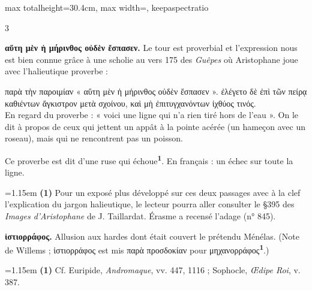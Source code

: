 \documentclass[11pt,twoside]{book}
\newcommand{\italique}[1]{\textit{#1}}
\newcommand{\citComm}[1]{\begin{quoting}[vskip=0.4pt,leftmargin=0.7em,rightmargin=0.2em]#1\end{quoting}}
\newcommand{\francais}[1]{{\policeFr #1}}
\newcommand{\marqueur}[1]{\textsuperscript{\color{rubricRed}\textbf{#1}}}
\begin{document}
\begin{adjustbox}{max totalheight=30.4cm, max width=\textwidth, keepaspectratio}
\begin{minipage}{\textwidth}
{\begin{multicols}{3}
\par\vspace{1.5pt}
 \textbf{αὕτη μὲν ἡ μήρινθος οὐδὲν ἔσπασεν.} Le tour est proverbial et l'expression nous est bien connue grâce à une scholie au vers 175 des \italique{Guêpes} où Aristophane joue avec l'halieutique proverbe :
\citComm{παρὰ τὴν παροιμίαν « αὕτη μὲν ἡ μήρινθος οὐδὲν ἔσπασεν ». ἐλέγετο δὲ ἐπὶ τῶν πείρᾳ καθιέντων ἄγκιστρον μετὰ σχοίνου, καὶ μὴ ἐπιτυγχανόντων ἰχθύος τινός.\\
\francais{En regard du proverbe : « voici une ligne qui n'a rien tiré hors de l'eau ». On le dit à propos de ceux qui jettent un appât à la pointe acérée (un hameçon avec un roseau), mais qui ne rencontrent pas un poisson.}}
\par\vspace{1.5pt}
\noindent Ce proverbe est dit d'une ruse qui échoue\marqueur{1}. En français : un échec sur toute la ligne.
\par\vspace{1.5pt}
\par\vspace{1.2pt}\par\nopagebreak\vspace{1pt}\noindent\hangindent=1.15em {\color{sepiaNote}\textbf{(1)}} Pour un exposé plus développé sur ces deux passages avec à la clef l'explication du jargon halieutique, le lecteur pourra aller consulter le §395 des \italique{Images d'Aristophane} de J. Taillardat. Érasme a recensé l'adage (n° 845).
\par\vspace{1.5pt}
 \textbf{ἱστιορράφος.} Allusion aux hardes dont était couvert le prétendu Ménélas. (Note de Willems ; ἱστιορράφος est mis παρὰ προσδοκίαν pour μηχανορράφος\marqueur{1}.)
\par\vspace{1.5pt}
\par\vspace{1.2pt}\par\nopagebreak\vspace{1pt}\noindent\hangindent=1.15em {\color{sepiaNote}\textbf{(1)}} Cf. Euripide, \italique{Andromaque}, vv. 447, 1116 ; Sophocle, \italique{Œdipe Roi}, v. 387.
\par\vspace{1.5pt}

\end{multicols}}
\end{minipage}
\end{adjustbox}
\end{document}
